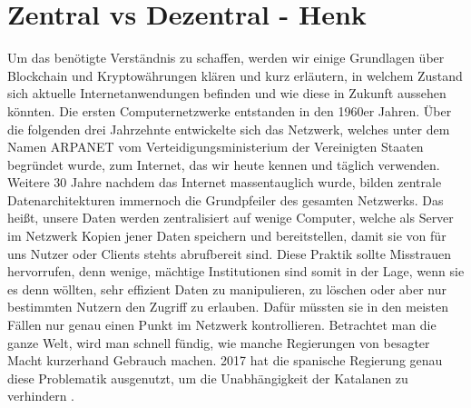 \section{Zentral vs Dezentral - Henk}
Um das benötigte Verständnis zu schaffen, werden wir einige Grundlagen über Blockchain und Kryptowährungen klären und kurz erläutern, in welchem Zustand sich aktuelle Internetanwendungen befinden und wie diese in Zukunft aussehen könnten. \newline
Die ersten Computernetzwerke entstanden in den 1960er Jahren. Über die folgenden drei Jahrzehnte entwickelte sich das Netzwerk, welches unter dem Namen ARPANET vom Verteidigungsministerium der Vereinigten Staaten begründet wurde, zum Internet, das wir heute kennen und täglich verwenden\cite{arpanet}. Weitere 30 Jahre nachdem das Internet massentauglich wurde, bilden zentrale Datenarchitekturen immernoch die Grundpfeiler des gesamten Netzwerks. Das heißt, unsere Daten werden zentralisiert auf wenige Computer, welche als Server im Netzwerk Kopien jener Daten speichern und bereitstellen, damit sie von für uns Nutzer oder Clients stehts abrufbereit sind. Diese Praktik sollte Misstrauen hervorrufen, denn wenige, mächtige Institutionen sind somit in der Lage, wenn sie es denn wöllten, sehr effizient Daten zu manipulieren, zu löschen oder aber nur bestimmten Nutzern den Zugriff zu erlauben. Dafür müssten sie in den meisten Fällen nur genau einen Punkt im Netzwerk kontrollieren. Betrachtet man die ganze Welt, wird man schnell fündig, wie manche Regierungen von besagter Macht kurzerhand Gebrauch machen. 2017 hat die spanische Regierung genau diese Problematik ausgenutzt, um die Unabhängigkeit der Katalanen zu verhindern \cite{catalonia}.
